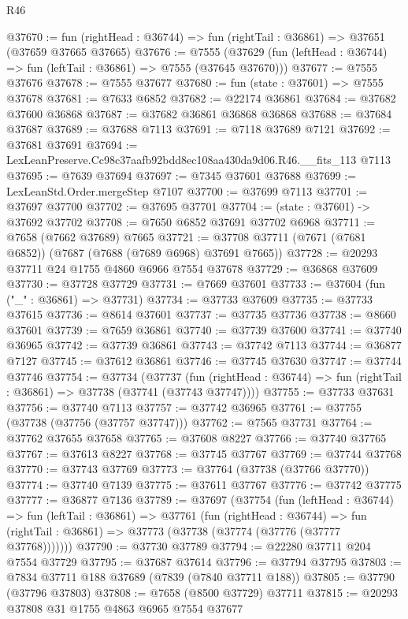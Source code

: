 \begin{lexlean}{R46}
\begin{coremodule}
@37670 := fun (rightHead : @36744) => fun (rightTail : @36861) => @37651 (@37659 @37665 @37665)
@37676 := @7555
    (@37629 (fun (leftHead : @36744) => fun (leftTail : @36861) => @7555 (@37645 @37670)))
@37677 := @7555 @37676
@37678 := @7555 @37677
@37680 := fun (state : @37601) => @7555 @37678
@37681 := @7633 @6852
@37682 := @22174 @36861
@37684 := @37682 @37600 @36868
@37687 := @37682 @36861 @36868 @36868
@37688 := @37684 @37687
@37689 := @37688 @7113
@37691 := @7118 @37689 @7121
@37692 := @37681 @37691
@37694 := LexLeanPreserve.Cc98c37aafb92bdd8ec108aa430da9d06.R46.__fits_113 @7113
@37695 := @7639 @37694
@37697 := @7345 @37601 @37688
@37699 := LexLeanStd.Order.mergeStep @7107
@37700 := @37699 @7113
@37701 := @37697 @37700
@37702 := @37695 @37701
@37704 := (state : @37601) -> @37692 @37702
@37708 := @7650 @6852 @37691 @37702 @6968
@37711 := @7658 (@7662 @37689) @7665
@37721 := @37708 @37711 (@7671 (@7681 @6852)) (@7687 (@7688 (@7689 @6968) @37691 @7665))
@37728 := @20293 @37711 @24 @1755 @4860 @6966 @7554 @37678
@37729 := @36868 @37609
@37730 := @37728 @37729
@37731 := @7669 @37601
@37733 := @37604 (fun ("_" : @36861) => @37731)
@37734 := @37733 @37609
@37735 := @37733 @37615
@37736 := @8614 @37601
@37737 := @37735 @37736
@37738 := @8660 @37601
@37739 := @7659 @36861
@37740 := @37739 @37600
@37741 := @37740 @36965
@37742 := @37739 @36861
@37743 := @37742 @7113
@37744 := @36877 @7127
@37745 := @37612 @36861
@37746 := @37745 @37630
@37747 := @37744 @37746
@37754 := @37734
    (@37737
      (fun (rightHead : @36744) => fun (rightTail : @36861) => @37738 (@37741 (@37743 @37747))))
@37755 := @37733 @37631
@37756 := @37740 @7113
@37757 := @37742 @36965
@37761 := @37755 (@37738 (@37756 (@37757 @37747)))
@37762 := @7565 @37731
@37764 := @37762 @37655 @37658
@37765 := @37608 @8227
@37766 := @37740 @37765
@37767 := @37613 @8227
@37768 := @37745 @37767
@37769 := @37744 @37768
@37770 := @37743 @37769
@37773 := @37764 (@37738 (@37766 @37770))
@37774 := @37740 @7139
@37775 := @37611 @37767
@37776 := @37742 @37775
@37777 := @36877 @7136
@37789 := @37697
    (@37754
      (fun (leftHead : @36744) =>
      fun (leftTail : @36861) =>
      @37761
        (fun (rightHead : @36744) =>
        fun (rightTail : @36861) => @37773 (@37738 (@37774 (@37776 (@37777 @37768)))))))
@37790 := @37730 @37789
@37794 := @22280 @37711 @204 @7554 @37729
@37795 := @37687 @37614
@37796 := @37794 @37795
@37803 := @7834 @37711 @188 @37689 (@7839 (@7840 @37711 @188))
@37805 := @37790 (@37796 @37803)
@37808 := @7658 (@8500 @37729) @37711
@37815 := @20293 @37808 @31 @1755 @4863 @6965 @7554 @37677

\end{coremodule}
\end{lexlean}
